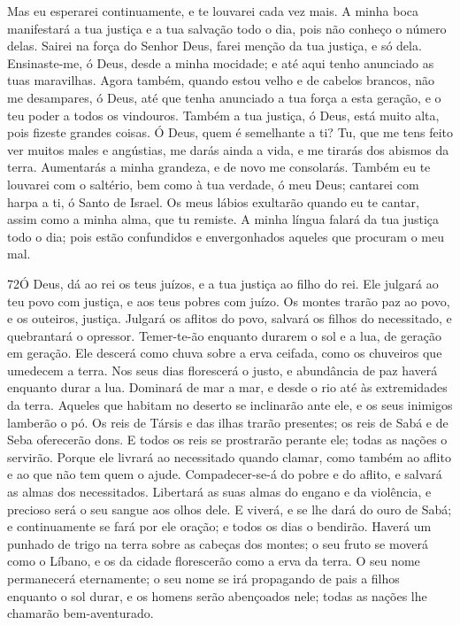 Mas eu esperarei continuamente, e te louvarei cada vez mais.
A minha boca manifestará a tua justiça e a tua salvação todo
o dia, pois não conheço o número delas. Sairei na força do
Senhor Deus, farei menção da tua justiça, e só dela.
Ensinaste-me, ó Deus, desde a minha mocidade; e até aqui
tenho anunciado as tuas maravilhas. Agora também, quando
estou velho e de cabelos brancos, não me desampares, ó Deus, até que
tenha anunciado a tua força a esta geração, e o teu poder a todos os
vindouros. Também a tua justiça, ó Deus, está muito alta,
pois fizeste grandes coisas. Ó Deus, quem é semelhante a ti?
Tu, que me tens feito ver muitos males e angústias, me darás
ainda a vida, e me tirarás dos abismos da terra. Aumentarás a
minha grandeza, e de novo me consolarás. Também eu te
louvarei com o saltério, bem como à tua verdade, ó meu Deus;
cantarei com harpa a ti, ó Santo de Israel. Os meus lábios
exultarão quando eu te cantar, assim como a minha alma, que tu
remiste. A minha língua falará da tua justiça todo o dia;
pois estão confundidos e envergonhados aqueles que procuram o meu
mal.

\bigskip

\lettrine{72}{}Ó Deus, dá ao rei os teus juízos, e a tua
justiça ao filho do rei.  Ele julgará ao teu povo
com justiça, e aos teus pobres com juízo. Os montes trarão paz
ao povo, e os outeiros, justiça. Julgará os aflitos do povo,
salvará os filhos do necessitado, e quebrantará o opressor.
Temer-te-ão enquanto durarem o sol e a lua, de geração em
geração. Ele descerá como chuva sobre a erva ceifada, como os
chuveiros que umedecem a terra. Nos seus dias florescerá o
justo, e abundância de paz haverá enquanto durar a lua. Dominará
de mar a mar, e desde o rio até às extremidades da terra.
Aqueles que habitam no deserto se inclinarão ante ele, e os seus
inimigos lamberão o pó. Os reis de Társis e das ilhas trarão
presentes; os reis de Sabá e de Seba oferecerão dons. E todos
os reis se prostrarão perante ele; todas as nações o servirão.
Porque ele livrará ao necessitado quando clamar, como também
ao aflito e ao que não tem quem o ajude. Compadecer-se-á do
pobre e do aflito, e salvará as almas dos necessitados.
Libertará as suas almas do engano e da violência, e precioso
será o seu sangue aos olhos dele. E viverá, e se lhe dará do
ouro de Sabá; e continuamente se fará por ele oração; e todos os
dias o bendirão. Haverá um punhado de trigo na terra sobre as
cabeças dos montes; o seu fruto se moverá como o Líbano, e os da
cidade florescerão como a erva da terra. O seu nome
permanecerá eternamente; o seu nome se irá propagando de pais a
filhos enquanto o sol durar, e os homens serão abençoados nele;
todas as nações lhe chamarão bem-aventurado.

